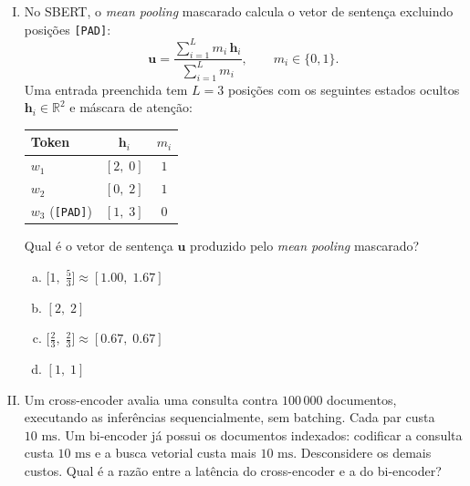 \documentclass{dlproblemset}
\begin{document}
\begin{enumerate}[I)]
\item No SBERT, o \textit{mean pooling} mascarado calcula o vetor de
      sentença excluindo posições \texttt{[PAD]}:
      \[
        \mathbf{u} = \frac{\sum_{i=1}^{L} m_i\,\mathbf{h}_i}{\sum_{i=1}^{L} m_i},
        \qquad m_i \in \{0,1\}.
      \]
      Uma entrada preenchida tem $L = 3$ posições com os seguintes estados ocultos
      $\mathbf{h}_i \in \mathbb{R}^2$ e máscara de atenção:

\begin{center}
\begin{tabular}{lcc}
  \toprule
  Token & $\mathbf{h}_i$ & $m_i$ \\
  \midrule
  $w_1$ & $[2,\;0]$ & $1$ \\
  $w_2$ & $[0,\;2]$ & $1$ \\
  $w_3$ (\texttt{[PAD]}) & $[1,\;3]$ & $0$ \\
  \bottomrule
\end{tabular}
\end{center}

Qual é o vetor de sentença $\mathbf{u}$ produzido pelo \textit{mean pooling} mascarado?

\begin{enumerate}[a)]
    \item $\bigl[1,\;\tfrac{5}{3}\bigr] \approx [1.00,\;1.67]$
    \item $[2,\;2]$
    \item $\bigl[\tfrac{2}{3},\;\tfrac{2}{3}\bigr] \approx [0.67,\;0.67]$
    \item $[1,\;1]$
\end{enumerate}

\item Um cross-encoder avalia uma consulta contra $100\,000$ documentos,
      executando as inferências sequencialmente, sem batching. Cada par
      custa $10\text{ ms}$.
      Um bi-encoder já possui os documentos indexados: codificar a consulta
      custa $10\text{ ms}$ e a busca vetorial custa mais $10\text{ ms}$.
      Desconsidere os demais custos.
      Qual é a razão entre a latência do cross-encoder e a do bi-encoder?


\end{enumerate}
\end{document}
